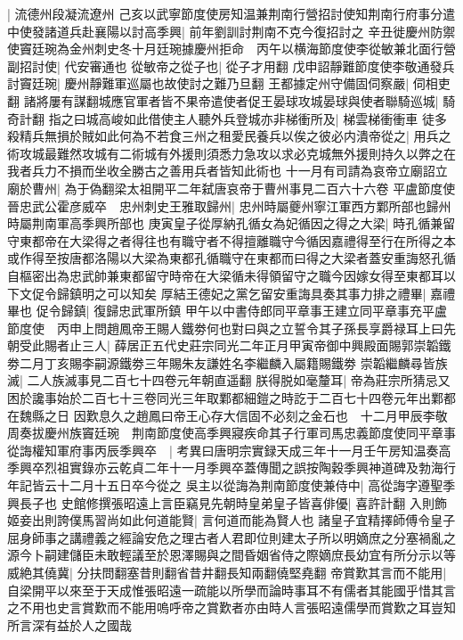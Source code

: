|{
	流德州段凝流遼州}
己亥以武寧節度使房知温兼荆南行營招討使知荆南行府事分遣中使發諸道兵赴襄陽以討高季興|{
	前年劉訓討荆南不克今復招討之}
辛丑徙慶州防禦使竇廷琬為金州刺史冬十月廷琬據慶州拒命　丙午以横海節度使李從敏兼北面行營副招討使|{
	代安審通也}
從敏帝之從子也|{
	從子才用翻}
戊申詔靜難節度使李敬通發兵討竇廷琬|{
	慶州靜難軍巡屬也故使討之難乃旦翻}
王都據定州守備固伺察嚴|{
	伺相吏翻}
諸將屢有謀翻城應官軍者皆不果帝遣使者促王晏球攻城晏球與使者聯騎巡城|{
	騎奇計翻}
指之曰城高峻如此借使主人聽外兵登城亦非梯衝所及|{
	梯雲梯衝衝車}
徒多殺精兵無損於賊如此何為不若食三州之租愛民養兵以俟之彼必内潰帝從之|{
	用兵之術攻城最難然攻城有二術城有外援則須悉力急攻以求必克城無外援則持久以弊之在我者兵力不損而坐收全勝古之善用兵者皆知此術也}
十一月有司請為哀帝立廟詔立廟於曹州|{
	為于偽翻梁太祖開平二年弑唐哀帝于曹州事見二百六十六卷}
平盧節度使晉忠武公霍彦威卒　忠州刺史王雅取歸州|{
	忠州時屬夔州寧江軍西方鄴所部也歸州時屬荆南軍高季興所部也}
庚寅皇子從厚納孔循女為妃循因之得之大梁|{
	時孔循兼留守東都帝在大梁得之者得往也有職守者不得擅離職守今循因嘉禮得至行在所得之本或作得至按唐都洛陽以大梁為東都孔循職守在東都而曰得之大梁者蓋安重誨怒孔循自樞密出為忠武帥兼東都留守時帝在大梁循未得領留守之職今因嫁女得至東都耳以下文促令歸鎮明之可以知矣}
厚結王德妃之黨乞留安重誨具奏其事力排之禮畢|{
	嘉禮畢也}
促令歸鎮|{
	復歸忠武軍所鎮}
甲午以中書侍郎同平章事王建立同平章事充平盧節度使　丙申上問趙鳳帝王賜人鐵劵何也對曰與之立誓令其子孫長享爵禄耳上曰先朝受此賜者止三人|{
	薛居正五代史莊宗同光二年正月甲寅帝御中興殿面賜郭崇韜鐵劵二月丁亥賜李嗣源鐵劵三年賜朱友謙姓名李繼麟入屬籍賜鐵劵}
崇韜繼麟尋皆族滅|{
	二人族滅事見二百七十四卷元年朝直遥翻}
朕得脱如毫釐耳|{
	帝為莊宗所猜忌又困於讒事始於二百七十三卷同光三年取鄴都細鎧之時訖于二百七十四卷元年出鄴都在魏縣之日}
因歎息久之趙鳳曰帝王心存大信固不必刻之金石也　十二月甲辰李敬周奏拔慶州族竇廷琬　荆南節度使高季興寢疾命其子行軍司馬忠義節度使同平章事從誨權知軍府事丙辰季興卒　|{
	考異曰唐明宗實録天成三年十一月壬午房知温奏高季興卒烈祖實錄亦云乾貞二年十一月季興卒蓋傳聞之誤按陶穀季興神道碑及勃海行年記皆云十二月十五日卒今從之}
吳主以從誨為荆南節度使兼侍中|{
	高從誨字遵聖季興長子也}
史館修撰張昭遠上言臣竊見先朝時皇弟皇子皆喜俳優|{
	喜許計翻}
入則飾姬妾出則誇僕馬習尚如此何道能賢|{
	言何道而能為賢人也}
諸皇子宜精擇師傅令皇子屈身師事之講禮義之經論安危之理古者人君即位則建太子所以明嫡庶之分塞禍亂之源今卜嗣建儲臣未敢輕議至於恩澤賜與之間昏姻省侍之際嫡庶長幼宜有所分示以等威絶其僥冀|{
	分扶問翻塞昔則翻省昔井翻長知兩翻僥堅堯翻}
帝賞歎其言而不能用|{
	自梁開平以來至于天成惟張昭遠一疏能以所學而論時事耳不有儒者其能國乎惜其言之不用也史言賞歎而不能用嗚呼帝之賞歎者亦由時人言張昭遠儒學而賞歎之耳豈知所言深有益於人之國哉}
